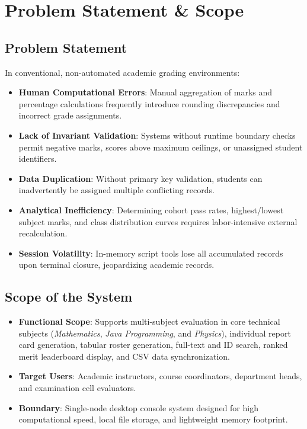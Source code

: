 \documentclass[12pt,a4paper]{report}
\begin{document}
\chapter{Problem Statement \& Scope}

\section{Problem Statement}
In conventional, non-automated academic grading environments:
\begin{itemize}
    \item \textbf{Human Computational Errors}: Manual aggregation of marks and percentage calculations frequently introduce rounding discrepancies and incorrect grade assignments.
    \item \textbf{Lack of Invariant Validation}: Systems without runtime boundary checks permit negative marks, scores above maximum ceilings, or unassigned student identifiers.
    \item \textbf{Data Duplication}: Without primary key validation, students can inadvertently be assigned multiple conflicting records.
    \item \textbf{Analytical Inefficiency}: Determining cohort pass rates, highest/lowest subject marks, and class distribution curves requires labor-intensive external recalculation.
    \item \textbf{Session Volatility}: In-memory script tools lose all accumulated records upon terminal closure, jeopardizing academic records.
\end{itemize}

\section{Scope of the System}
\begin{itemize}
    \item \textbf{Functional Scope}: Supports multi-subject evaluation in core technical subjects (\textit{Mathematics}, \textit{Java Programming}, and \textit{Physics}), individual report card generation, tabular roster generation, full-text and ID search, ranked merit leaderboard display, and CSV data synchronization.
    \item \textbf{Target Users}: Academic instructors, course coordinators, department heads, and examination cell evaluators.
    \item \textbf{Boundary}: Single-node desktop console system designed for high computational speed, local file storage, and lightweight memory footprint.
\end{itemize}
\end{document}
